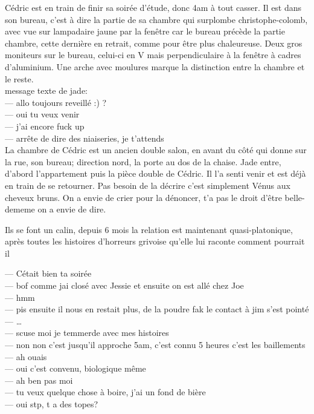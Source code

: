  Cédric est en train de finir sa soirée d'étude, donc 4am à tout casser. Il est
dans son bureau, c'est à dire la partie de sa chambre qui surplombe
christophe-colomb, avec vue sur lampadaire jaune par la fenêtre car le bureau
précède la partie chambre, cette dernière en retrait, comme pour être plus
chaleureuse. Deux gros moniteurs sur le bureau, celui-ci en V mais
perpendiculaire à la fenêtre à cadres d'aluminium. Une arche avec moulures
marque la distinction entre la chambre et le reste. \\

message texte de jade:\\
--- allo toujours reveillé :) ?\\
--- oui tu veux venir\\
--- j'ai encore fuck up\\
--- arrête de dire des niaiseries, je t'attends\\

La chambre de Cédric est un ancien double salon, en avant du côté qui donne sur
la rue, son bureau; direction nord, la porte au dos de la chaise. Jade entre, d'abord
l'appartement puis la pièce double de Cédric. Il l'a senti venir et est déjà en train
de se retourner. Pas besoin de la décrire c'est simplement Vénus aux cheveux
bruns. On a envie de crier pour la dénoncer, t'a pas le droit d'être
belle-dememe on a envie de dire.

Ils se font un calin, depuis 6 mois la relation est maintenant quasi-platonique,
après toutes les histoires d'horreurs grivoise qu'elle lui raconte comment
pourrait il

--- Cétait bien ta soirée\\
--- bof comme jai closé avec Jessie et ensuite on est allé chez Joe\\
--- hmm\\
--- pis ensuite il nous en restait plus, de la poudre fak le contact à jim s'est pointé\\
--- \ldots\\
--- scuse moi je temmerde avec mes histoires\\
--- non non c'est jusqu'il approche 5am, c'est connu 5 heures c'est les baillements\\
--- ah ouais\\
--- oui c'est convenu, biologique même\\
--- ah ben pas moi\\
--- tu veux quelque chose à boire, j'ai un fond de bière\\
--- oui stp, t a des topes?\\

